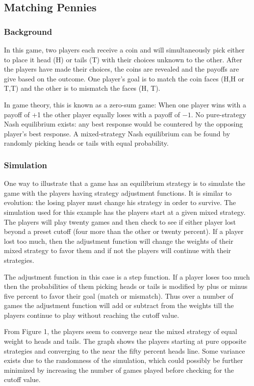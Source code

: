 \subsection{Matching Pennies}

\subsubsection{Background}
In this game, two players each receive a coin and will simultaneously pick either to place it head (H) or tails (T) with their choices unknown to the other. After the players have made their choices, the coins are revealed and the payoffs are give based on the outcome. One player's goal is to match the coin faces (H,H or T,T) and the other is to mismatch the faces (H, T). 

In game theory, this is known as a zero-sum game: When one player wins with a payoff of +1 the other player equally loses with a payoff of $-1$. No pure-strategy Nash equilibrium exists: any best response would be countered by the opposing player's best response. A mixed-strategy Nash equilibrium can be found by randomly picking heads or tails with equal probability.  


\subsubsection{Simulation}
One way to illustrate that a game has an equilibrium strategy is to simulate the game with the players having strategy adjustment functions. It is similar to evolution: the losing player must change his strategy in order to survive. The simulation used for this example has the players start at a given mixed strategy. The players will play twenty games and then check to see if either player lost beyond a preset cutoff (four more than the other or twenty percent). If a player lost too much, then the adjustment function will change the weights of their mixed strategy to favor them and if not the players will continue with their strategies.

The adjustment function in this case is a step function. If a player loses too much then the probabilities of them picking heads or tails is modified by plus or minus five percent to favor their goal (match or mismatch).  Thus over a number of games the adjustment function will add or subtract from the weights till the players continue to play without reaching the cutoff value.  

From Figure 1, the players seem to converge near the mixed strategy of equal weight to heads and tails. The graph shows the players starting at pure opposite strategies and converging to the near the fifty percent heads line. Some variance exists due to the randomness of the simulation, which could possibly be further minimized by increasing the number of games played before checking for the cutoff value.

